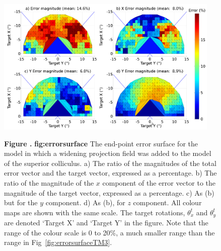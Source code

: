 \documentclass{frontiersSCNS}
\begin{document}
\begin{figure}[htb!]
\begin{center}
\includegraphics[width=0.95\textwidth]{./figures/errorsurface.png}
\end{center}
\textbf{\label{fig:errorsurface} Figure .}
{ \textbf{fig:errorsurface} The end-point error surface for the model
in which a widening projection field was added to the model of the
superior colliculus. a) The
ratio of the magnitudes of the total error vector and the target
vector, expressed as a percentage. b) The ratio of the magnitude
of the $x$ component of the error vector to the magnitude of the
target vector, expressed as a percentage. c) As (b) but for the
$y$ component. d) As (b), for $z$ component. All colour maps are
shown with the same scale. The target rotations, $\theta_{x}^t$ and
$\theta_{y}^t$ are denoted `Target X' and `Target Y' in the figure.
Note that the range of the colour scale is 0 to 20\%, a much smaller
range than the range in Fig~\ref{fig:errorsurfaceTM3}.}
\end{figure}
\end{document}
